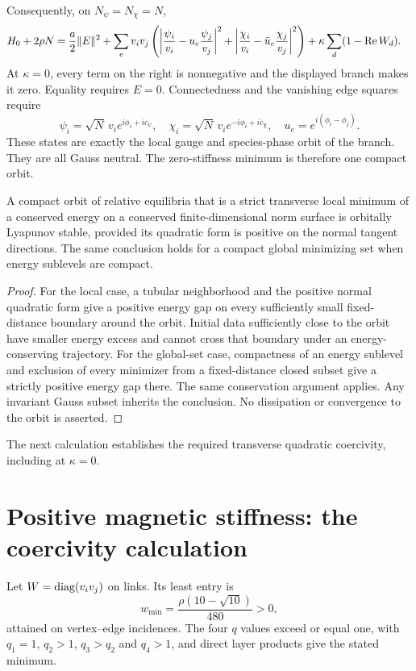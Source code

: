 \documentclass[11pt,a4paper]{article}
\begin{document}
Consequently, on $N_\psi=N_\chi=N$,
\begin{align}
H_0+2\rho N={}&\frac a2\|E\|^2+
\sum_e v_iv_j\left(\left|\frac{\psi_i}{v_i}-u_e\frac{\psi_j}{v_j}\right|^2
+\left|\frac{\chi_i}{v_i}-\bar u_e\frac{\chi_j}{v_j}\right|^2\right)
+\kappa\sum_d(1-\operatorname{Re} W_d).
\label{eq:energy}
\end{align}
At $\kappa=0$, every term on the right is nonnegative and the displayed branch makes it zero. Equality requires $E=0$. Connectedness and the vanishing edge squares require
\[
\psi_i=\sqrt N\,v_i e^{i\phi_i+i c_\psi},\quad
\chi_i=\sqrt N\,v_i e^{-i\phi_i+i c_\chi},\quad
u_e=e^{i(\phi_i-\phi_j)}.
\]
These states are exactly the local gauge and species-phase orbit of the branch. They are all Gauss neutral. The zero-stiffness minimum is therefore one compact orbit.

\begin{lemma}\label{lem:barrier}
A compact orbit of relative equilibria that is a strict transverse local minimum of a conserved energy on a conserved finite-dimensional norm surface is orbitally Lyapunov stable, provided its quadratic form is positive on the normal tangent directions. The same conclusion holds for a compact global minimizing set when energy sublevels are compact.
\end{lemma}
\begin{proof}
For the local case, a tubular neighborhood and the positive normal quadratic form give a positive energy gap on every sufficiently small fixed-distance boundary around the orbit. Initial data sufficiently close to the orbit have smaller energy excess and cannot cross that boundary under an energy-conserving trajectory. For the global-set case, compactness of an energy sublevel and exclusion of every minimizer from a fixed-distance closed subset give a strictly positive energy gap there. The same conservation argument applies. Any invariant Gauss subset inherits the conclusion. No dissipation or convergence to the orbit is asserted.
\end{proof}
The next calculation establishes the required transverse quadratic coercivity, including at $\kappa=0$.

\newpage
\section{Positive magnetic stiffness: the coercivity calculation}
Let $W=\operatorname{diag}(v_iv_j)$ on links. Its least entry is
\[
w_{\min}=\frac{\rho(10-\sqrt{10})}{480}>0,
\]
attained on vertex--edge incidences. The four $q$ values exceed or equal one, with $q_1=1$, $q_2>1$, $q_3>q_2$ and $q_4>1$, and direct layer products give the stated minimum.
\end{document}

